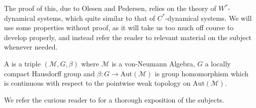 \begin{remark}
	The proof of this, due to Olesen and Pedersen, relies on the theory of $W^*$-dynamical systems, which quite similar to that of $C^*$-dynamical systems. We will use some properties without proof, as it will take us too much off course to develop properly, and instead refer the reader to relevant material on the subject whenever needed.	
\begin{definition}
	A  is a triple $(\mathscr{M},G,\beta)$ where $\mathscr{M}$ is a von-Neumann Algebra, $G$ a locally compact Hausdorff group and $\beta \colon G \to \mathrm{Aut}(\mathscr{M})$ is group homomorphism which is continuous with respect to the pointwise weak topology on $\mathrm{Aut}(\mathscr{M})$.
\end{definition}
	 We refer the curious reader to \cite[Chapter 7.4 and 7.10]{pedersenalgauto} for a thorough exposition of the subjects.
\end{remark}
